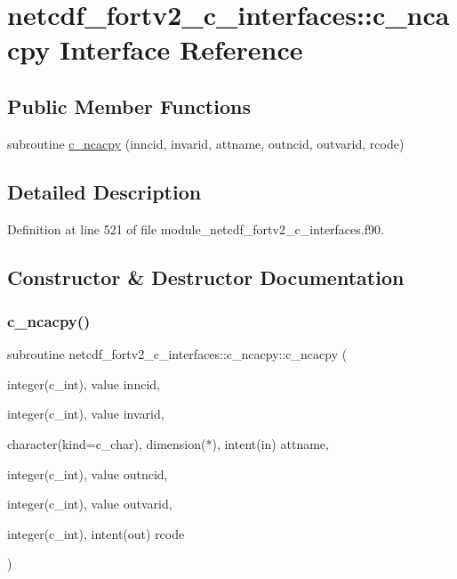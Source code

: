 \hypertarget{interfacenetcdf__fortv2__c__interfaces_1_1c__ncacpy}{}\section{netcdf\+\_\+fortv2\+\_\+c\+\_\+interfaces\+:\+:c\+\_\+ncacpy Interface Reference}
\label{interfacenetcdf__fortv2__c__interfaces_1_1c__ncacpy}
\subsection*{Public Member Functions}
\begin{DoxyCompactItemize}
\item 
subroutine \hyperlink{interfacenetcdf__fortv2__c__interfaces_1_1c__ncacpy_a4635d02b1e763129be8a6c4a2d613e69}{c\+\_\+ncacpy} (inncid, invarid, attname, outncid, outvarid, rcode)
\end{DoxyCompactItemize}


\subsection{Detailed Description}


Definition at line 521 of file module\+\_\+netcdf\+\_\+fortv2\+\_\+c\+\_\+interfaces.\+f90.



\subsection{Constructor \& Destructor Documentation}
\mbox{\label{interfacenetcdf__fortv2__c__interfaces_1_1c__ncacpy_a4635d02b1e763129be8a6c4a2d613e69}} 
\subsubsection{\texorpdfstring{c\+\_\+ncacpy()}{c\_ncacpy()}}
{\footnotesize\ttfamily subroutine netcdf\+\_\+fortv2\+\_\+c\+\_\+interfaces\+::c\+\_\+ncacpy\+::c\+\_\+ncacpy (\begin{DoxyParamCaption}\item[{integer(c\+\_\+int), value}]{inncid,  }\item[{integer(c\+\_\+int), value}]{invarid,  }\item[{character(kind=c\+\_\+char), dimension($\ast$), intent(in)}]{attname,  }\item[{integer(c\+\_\+int), value}]{outncid,  }\item[{integer(c\+\_\+int), value}]{outvarid,  }\item[{integer(c\+\_\+int), intent(out)}]{rcode }\end{DoxyParamCaption})}



